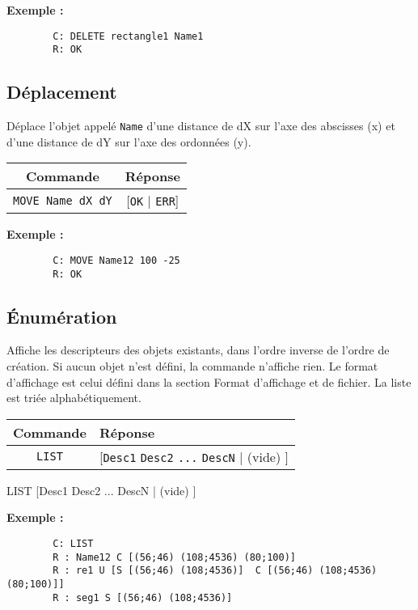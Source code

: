 \documentclass[11pt,a4paper]{article}
\begin{document}
	\textbf{Exemple :}
	\begin{verbatim}
		C: DELETE rectangle1 Name1
		R: OK
	\end{verbatim}
	
	\subsection{Déplacement}
	Déplace l'objet appelé \texttt{Name} d’une distance de dX sur l'axe des abscisses (x) et d’une distance de dY sur l'axe des ordonnées (y).
	
	\begin{center}
		\begin{tabular}[c]{|c | c|}
			\hline
			\textbf{Commande} & \textbf{Réponse} \\
			\hline
			\texttt{MOVE Name dX dY} & [\texttt{OK} | \texttt{ERR}] \\
			\hline
		\end{tabular}
	\end{center}
	
	\textbf{Exemple :}
	\begin{verbatim}
		C: MOVE Name12 100 -25
		R: OK
	\end{verbatim}
	
	\subsection{Énumération}
	Affiche les descripteurs des objets existants, dans l’ordre inverse de l’ordre de création. Si aucun objet n’est défini, la commande n’affiche rien. Le format d’affichage est celui défini dans la section Format d’affichage et de fichier. La liste est triée alphabétiquement.
	
	\begin{center}
		\begin{tabular}[c]{|c | p{3cm}|}
			\hline
			\textbf{Commande} & \textbf{Réponse} \\
			\hline
			\texttt{LIST} & [\texttt{Desc1} \newline \texttt{Desc2} \newline \texttt{...} \newline \texttt{DescN} | (vide) ] \\
			\hline
		\end{tabular}
	\end{center}
	LIST
	[Desc1
	Desc2
	...
	DescN | (vide) ]
	
	\textbf{Exemple :}
	\begin{verbatim}
		C: LIST
		R : Name12 C [(56;46) (108;4536) (80;100)]
		R : re1 U [S [(56;46) (108;4536)]  C [(56;46) (108;4536) (80;100)]]
		R : seg1 S [(56;46) (108;4536)]
	\end{verbatim}
	
\end{document}
